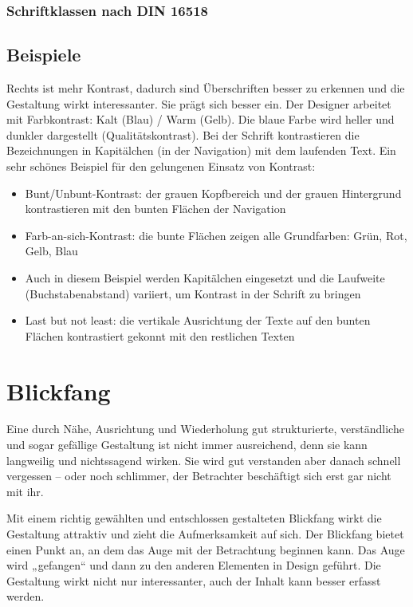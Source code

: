 \subsubsection{Schriftklassen nach DIN 16518}

\subsection{Beispiele}
Rechts ist mehr Kontrast, dadurch sind Überschriften besser zu erkennen und die Gestaltung wirkt interessanter. Sie prägt sich besser ein.
Der Designer arbeitet mit Farbkontrast: Kalt (Blau) / Warm (Gelb). Die blaue Farbe wird heller und dunkler dargestellt (Qualitätskontrast). Bei der Schrift kontrastieren die Bezeichnungen in Kapitälchen (in der Navigation) mit dem laufenden Text.
Ein sehr schönes Beispiel für den gelungenen Einsatz von Kontrast:

\begin{itemize}
\item Bunt/Unbunt-Kontrast: der grauen Kopfbereich und der grauen Hintergrund kontrastieren mit den bunten Flächen der Navigation
\item Farb-an-sich-Kontrast: die bunte Flächen zeigen alle Grundfarben: Grün, Rot, Gelb, Blau
\item Auch in diesem Beispiel werden Kapitälchen eingesetzt und die Laufweite (Buchstabenabstand) variiert, um Kontrast in der Schrift zu bringen
\item Last but not least: die vertikale Ausrichtung der Texte auf den bunten Flächen kontrastiert gekonnt mit den restlichen Texten
\end{itemize}

\section{Blickfang}
Eine durch Nähe, Ausrichtung und Wiederholung gut strukturierte, verständliche und sogar gefällige Gestaltung ist nicht immer ausreichend, denn sie kann langweilig und nichtssagend wirken. Sie wird gut verstanden aber danach schnell vergessen – oder noch schlimmer, der Betrachter beschäftigt sich erst gar nicht mit ihr.

Mit einem richtig gewählten und entschlossen gestalteten Blickfang wirkt die Gestaltung attraktiv und zieht die Aufmerksamkeit auf sich. Der Blickfang bietet einen Punkt an, an dem das Auge mit der Betrachtung beginnen kann. Das Auge wird „gefangen“ und dann zu den anderen Elementen in Design geführt. Die Gestaltung wirkt nicht nur interessanter, auch der Inhalt kann besser erfasst werden.

